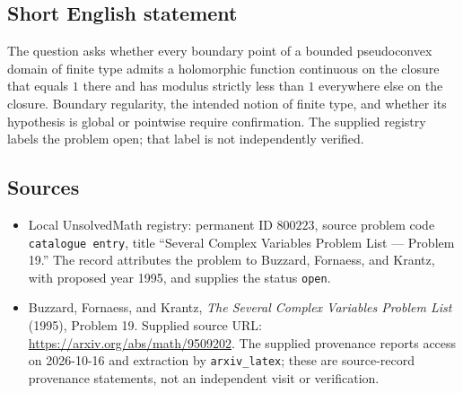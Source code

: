 \documentclass[11pt]{article}
\begin{document}
\subsection{Short English statement}
The question asks whether every boundary point of a bounded pseudoconvex domain of finite type admits a holomorphic function continuous on the closure that equals \(1\) there and has modulus strictly less than \(1\) everywhere else on the closure. Boundary regularity, the intended notion of finite type, and whether its hypothesis is global or pointwise require confirmation. The supplied registry labels the problem open; that label is not independently verified.
\subsection{Sources}
\begin{itemize}
\item Local UnsolvedMath registry: permanent ID \(800223\), source problem code \texttt{catalogue entry}, title ``Several Complex Variables Problem List --- Problem 19.'' The record attributes the problem to Buzzard, Fornaess, and Krantz, with proposed year 1995, and supplies the status \texttt{open}.
\item Buzzard, Fornaess, and Krantz, \emph{The Several Complex Variables Problem List} (1995), Problem 19. Supplied source URL: \url{https://arxiv.org/abs/math/9509202}. The supplied provenance reports access on 2026-10-16 and extraction by \texttt{arxiv\_latex}; these are source-record provenance statements, not an independent visit or verification.
\end{itemize}
\end{document}

